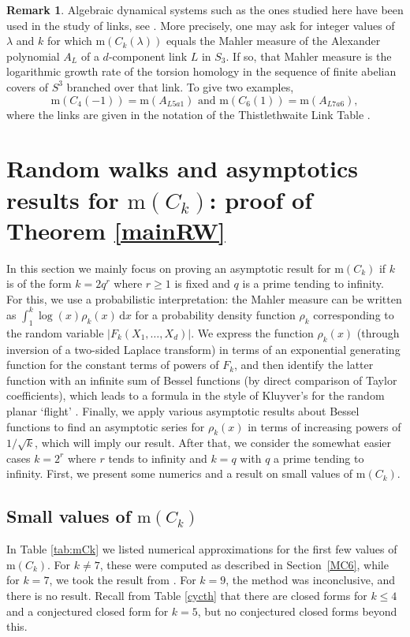 \documentclass[12pt,reqno]{amsart}
\theoremstyle{definition}
\theoremstyle{plain}
\theoremstyle{definition}
\newtheorem{remark}[theorem]{Remark}
\newcommand\m{\mathrm{m}}
\renewcommand{\geq}{\geqslant}
\renewcommand{\leq}{\leqslant}
\renewcommand{\d}{\mathrm{d}}
\begin{document}
\begin{remark} \label{rem:links} Algebraic dynamical systems such as the ones studied here have been used in the study of links, see \cite{SilverWilliams}. More precisely, one may ask for integer values of $\lambda$ and $k$ for which $\m(C_k(\lambda))$ equals the Mahler measure of the Alexander polynomial $A_L$ of a $d$-component link $L$ in $S_3$. If so, that Mahler measure is the logarithmic growth rate of the torsion homology in the sequence of finite abelian covers of $S^3$ branched over that link. To give two examples,
$$ \m(C_4(-1)) = \m(A_{L5a1}) \mbox{ and } \m(C_6(1)) = \m(A_{L7a6}), $$
where the links are given in the notation of the Thistlethwaite Link Table \cite{Links}. 
\end{remark}

\section{Random walks and asymptotics results for $\m(C_k)$: proof of Theorem \ref{mainRW}} 
\label{sec:random_walks_and_asymp_mCk}

In this section we mainly focus on proving an asymptotic result for $\m(C_k)$ if $k$ is of the form $k = 2q^r$ where $r \geq 1$ is fixed and $q$ is a prime tending to infinity. For this, we use a probabilistic interpretation: the Mahler measure can be written as $\int_1^k \log(x) \rho_k(x) \, \d x$ for a probability density function $\rho_k$ corresponding to the random variable $|F_k(X_1,\dots,X_d)|$. We express the function $\rho_k(x)$ (through inversion of a two-sided Laplace transform) in terms of an exponential generating function for the constant terms of powers of $F_k$, and then identify the latter function with an infinite sum of Bessel functions (by direct comparison of Taylor coefficients), which leads to a formula in the style of Kluyver's for the random planar `flight' \cite{kluyver1906local}. Finally, we apply various asymptotic results about Bessel functions to find an asymptotic series for $\rho_k(x)$ in terms of increasing powers of $1/\sqrt{k}$, which will imply our result. After that, we consider the somewhat easier cases $k=2^r$ where $r$ tends to infinity and $k=q$ with $q$ a prime tending to infinity. First, we present some numerics and a result on small values of $\m(C_k)$. 

\subsection{Small values of $\m(C_k)$} In Table \ref{tab:mCk} we listed numerical approximations for the first few values of $\m(C_k)$.  For $k \neq 7$, these were computed as described in Section~\ref{MC6}, while for $k = 7$, we took the result from \cite[Table 2, case $n=8$]{Bailey}. For $k=9$, the method was inconclusive, and there is no result. Recall from Table \ref{cycth} that there are closed forms for $k \leq 4$ and a conjectured closed form for $k=5$, but no conjectured closed forms beyond this. 
\end{document}
